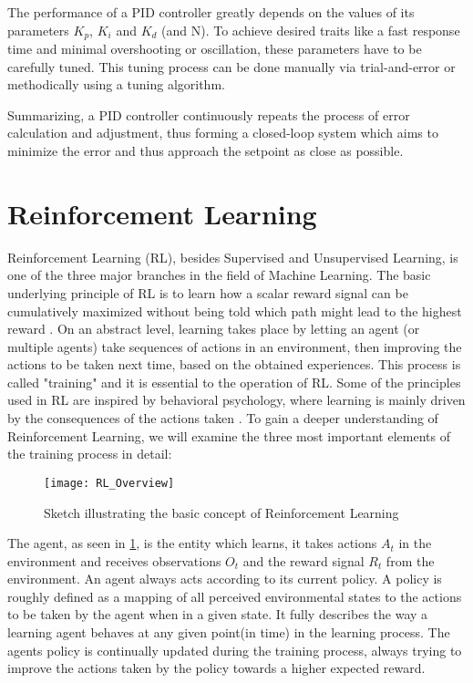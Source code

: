 The performance of a PID controller greatly depends on the values of its parameters $K_p$, $K_i$ and $K_d$ (and N).
To achieve desired traits like a fast response time and minimal overshooting or oscillation, these parameters have to be carefully tuned. 
This tuning process can be done manually via trial-and-error or methodically using a tuning algorithm.

Summarizing, a PID controller continuously repeats the process of error calculation and adjustment, thus forming a closed-loop system which aims to minimize the error and thus approach the setpoint as close as possible.



\section{Reinforcement Learning} \label{sec: Reinforcement Learning}

Reinforcement Learning (RL), besides Supervised and Unsupervised Learning, is one of the three major branches in the field of Machine Learning.
The basic underlying principle of RL is to learn how a scalar reward signal can be cumulatively maximized without being told which path might lead to the highest reward \parencite{sutton2018reinforcement}.
On an abstract level, learning takes place by letting an agent (or multiple agents) take sequences of actions in an environment, then improving the actions to be taken next time, based on the obtained experiences.
This process is called "training" and it is essential to the operation of RL.
Some of the principles used in RL are inspired by behavioral psychology, where learning is mainly driven by the consequences of the actions taken \parencite{sutton2018reinforcement, joshi2021reinforcement}.
To gain a deeper understanding of Reinforcement Learning, we will examine the three most important elements of the training process in detail:

\begin{figure}[h]
	\centerline{\texttt{[image: RL\_Overview]}}
	\caption{Sketch illustrating the basic concept of Reinforcement Learning}
	\label{figure: RL Illustration}
\end{figure}

The agent, as seen in \ref{figure: RL Illustration}, is the entity which learns, it takes actions $A_t$ in the environment and receives observations $O_t$ and the reward signal $R_t$ from the environment.
An agent always acts according to its current policy.
A policy is roughly defined as a mapping of all perceived environmental states to the actions to be taken by the agent when in a given state.
It fully  describes the way a learning agent behaves at any given point(in time) in the learning process.\parencite{sutton2018reinforcement} \parencite{silver2015}
The agents policy is continually updated during the training process, always trying to improve the actions taken by the policy towards a higher expected reward.

